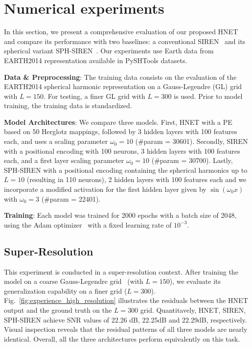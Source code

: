 \documentclass[conference]{IEEEtran}
\begin{document}
\section{Numerical experiments}
\label{sec:numerical_experiments}
In this section, we present a comprehensive evaluation of our proposed HNET and compare its performance with two baselines: a conventional SIREN~\cite{sitzmann2020implicitneuralrepresentationsperiodic} and its spherical variant SPH-SIREN~\cite{russwurm2024locationencoding}. Our experiments use Earth data from EARTH2014 representation available in PySHTools datasets.

\noindent \textbf{Data \& Preprocessing}:
The training data consists on the evaluation of the EARTH2014 spherical harmonic representation on a Gauss-Legendre (GL) grid~\cite{price:s2fft} with $L = 150$. For testing, a finer GL grid with $L=300$ is used. Prior to model training, the training data is standardized. 

\noindent \textbf{Model Architectures}:  
We compare three models. First, HNET with a PE based on 50 Herglotz mappings, followed by 3 hidden layers with 100 features each, and uses a scaling parameter \(\omega_0=10\) (\#param = 30601). Secondly, SIREN with a positional encoding with 100 neurons, 3 hidden layers with 100 features each, and a first layer scaling parameter \(\omega_0=10\) (\#param = 30700). Lastly, SPH-SIREN with a positional encoding containing the  spherical harmonics up to \(L=10\) (resulting in 110 neurons), 2 hidden layers with 100 features each and we incorporate a modified activation for the first hidden layer given by \(\sin(\omega_0 x)\) with \(\omega_0=3\) (\#param = 22401).

\noindent \textbf{Training}: Each model was trained for 2000 epochs with a batch size of 2048, using the Adam optimizer~\cite{Kingma2014AdamAM} with a fixed learning rate of $10^{-3}$. 


\subsection{Super-Resolution}
This experiment is conducted in a super-resolution context. After training the model on a coarse Gauss-Legendre grid~\cite{price:s2fft} (with $L=150$), we evaluate its generalization capability on a finer grid ($L = 300$). Fig.~\ref{fig:experience_high_resolution} illustrates the residuals between the HNET output and the ground truth on the $L=300$ grid. Quantitavely, HNET, SIREN, SPH-SIREN achieve SNR values of 22.26 dB, 22.25dB and 22.29dB, respectively. Visual inspection reveals that the residual patterns of all three models are nearly identical. Overall, all the three architectures perform equivalently on this task.
\end{document}
